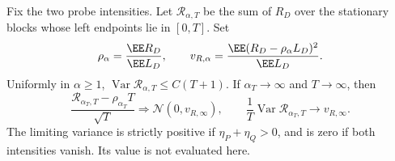 \documentclass[11pt,letterpaper]{article}
\begin{document}
\begin{corollary}
\label{cor:line-remainder-spatial-CLT}
Fix the two probe intensities. Let $\mathcal R_{\alpha,T}$
be the sum of $R_D$ over the stationary blocks whose left
endpoints lie in $[0,T]$. Set
\[
 \rho_\alpha=\frac{\EE R_D}{\EE L_D},\qquad
 v_{R,\alpha}=\frac{\EE(R_D-\rho_\alpha L_D)^2}{\EE L_D}.
\]
Uniformly in $\alpha\ge1$,
$\operatorname{Var}\mathcal R_{\alpha,T}\le C(T+1)$.
If $\alpha_T\to\infty$ and $T\to\infty$, then
\[
 \frac{\mathcal R_{\alpha_T,T}-\rho_{\alpha_T}T}{\sqrt T}
       \Longrightarrow\mathcal N(0,v_{R,\infty}),
 \qquad
 \frac1T\operatorname{Var}\mathcal R_{\alpha_T,T}
                       \longrightarrow v_{R,\infty}.
\]
The limiting variance is strictly positive if $\eta_P+\eta_Q>0$,
and is zero if both intensities vanish. Its value is not evaluated here.
\end{corollary}
\end{document}
